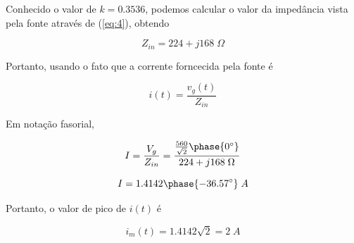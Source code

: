 \documentclass[12pt]{scrartcl}
\begin{document}
    Conhecido o valor de \(k = 0.3536\), podemos calcular o valor da impedância vista pela fonte através de (\ref{eq:4}), obtendo

    \[ Z_{in} = 224 + j168 \; \Omega \]

    Portanto, usando o fato que a corrente forncecida pela fonte é 

    \[ i(t) = \frac{v_g(t)}{Z_{in}} \]

    Em notação fasorial,

    \[ I = \frac{V_g}{Z_{in}} = \frac{\frac{560}{\sqrt{2}}\phase{0^{\circ}}}{224 + j168 \; \Omega} \]

    \[ I = 1.4142\phase{-36.57^{\circ}} \; A \]

    Portanto, o valor de pico de \(i(t)\) é

    \[ \boxed{i_m(t) = 1.4142 \sqrt{2} = 2 \; A}  \]


\end{document}
